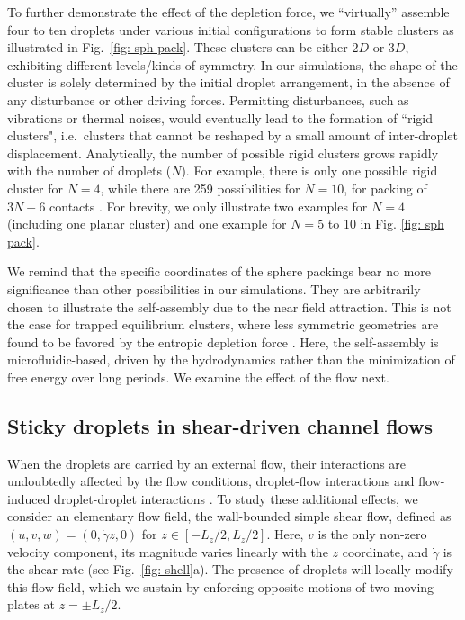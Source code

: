 To further demonstrate the effect of the depletion force, we ``virtually'' assemble four to ten droplets under various initial configurations to form stable clusters as illustrated in Fig.\ \ref{fig: sph pack}. These clusters can be either $2D$ or $3D$, exhibiting different levels/kinds of symmetry. In our simulations, the shape of the cluster is solely determined by the initial droplet arrangement, in the absence of any disturbance or other driving forces. Permitting disturbances, such as vibrations or thermal noises, would eventually lead to the formation of ``rigid clusters", i.e.\ clusters that cannot be reshaped by a small amount of inter-droplet displacement. Analytically, the number of possible rigid clusters grows rapidly with the number of droplets ($N$). For example, there is only one possible rigid cluster for $N = 4$, while there are 259 possibilities for $N = 10$, for packing of $3N-6$ contacts  \cite{Holmes-Cerfon}. For brevity, we only illustrate two examples for $N = 4$ (including one planar cluster) and one example for $N = 5$ to 10 in Fig. \ref{fig: sph pack}. 

We remind that the specific coordinates of the sphere packings bear no more significance than other possibilities in our simulations. They are arbitrarily chosen to illustrate the self-assembly due to the near field attraction. This is not the case for trapped equilibrium clusters, where less symmetric geometries are found to be favored by the entropic depletion force \cite{Meng2010,Klein2018}.  Here, the self-assembly is microfluidic-based, driven by the hydrodynamics rather than the minimization of free energy over long periods. We examine the effect of the flow next.

\subsection{Sticky droplets in shear-driven channel flows} \label{sec:shear}

When the droplets are carried by an external flow, their interactions are undoubtedly affected by the flow conditions, droplet-flow interactions and flow-induced droplet-droplet interactions \cite{Fouxon_2017}. To study these additional effects, we consider an elementary flow field, the wall-bounded simple shear flow, defined as $(u,v,w)=(0, \dot{\gamma}z,0)$ for $z \in [-L_z/2,L_z/2]$. Here, $v$ is the only non-zero velocity component, its magnitude varies linearly with the $z$ coordinate, and $\dot{\gamma}$ is the shear rate (see Fig.\  \ref{fig: shell}a). The presence of droplets will locally modify this flow field, which we sustain by enforcing opposite motions of two moving plates at $z= \pm L_z/2$.

